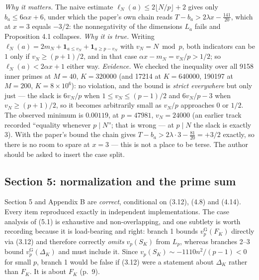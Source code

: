 \documentclass[11pt]{article}
\theoremstyle{definition}
\newcommand{\vG}{v_p^{\mathrm{G}}}
\begin{document}
\noindent\emph{Why it matters.} The naive estimate $\ell_N(a)\le2\lfloor N/p\rfloor+2$ gives only
$b_a\le6\alpha x+6$, under which the paper's own chain reads
$T-b_a>2\lambda x-\tfrac{141}{20}$, which at $x=3$ equals $-3/2$: the nonnegativity of the
dimensions $L_a$ fails and Proposition 4.1 collapses. \emph{Why it is true.} Writing
$\ell_N(a)=2m_N+\mathbf{1}_{a\le v_N}+\mathbf{1}_{a\ge p-v_N}$ with $v_N=N\bmod p$, both
indicators can be $1$ only if $v_N\ge(p+1)/2$, and in that case $\alpha x-m_N=v_N/p>1/2$; so
$\ell_N(a)<2\alpha x+1$ either way. \emph{Evidence.} We checked the inequality over all 9158
inner primes at $M=40$, $K=320000$ (and 17214 at $K=640000$, 190197 at $M=200$,
$K=8\times10^6$): no violation, and the bound is \emph{strict everywhere} but only just ---
the slack is $6v_N/p$ when $1\le v_N\le(p-1)/2$ and $6v_N/p-3$ when $v_N\ge(p+1)/2$, so it
becomes arbitrarily small as $v_N/p$ approaches $0$ or $1/2$. The observed minimum is
$0.00119$, at $p=47981$, $v_N=24000$ (an earlier track recorded ``equality whenever $p\mid N$'';
that is wrong --- at $p\mid N$ the slack is exactly $3$). With the paper's bound the chain gives
$T-b_a>2\lambda\cdot3-\tfrac{81}{20}=+3/2$ exactly, so there is no room to spare at $x=3$ ---
this is not a place to be terse. The author should be asked to insert the case split.

\subsection{Section 5: normalization and the prime sum}

Section 5 and Appendix B are \emph{correct}, conditional on (3.12), (4.8) and (4.14). Every item
reproduced exactly in independent implementations. The case analysis of (5.1) is exhaustive and
non-overlapping, and one subtlety is worth recording because it is load-bearing and right:
branch 1 bounds $\vG(F_K)$ directly via (3.12) and therefore correctly \emph{omits} $v_p(S_K)$
from $L_p$, whereas branches 2--3 bound $\vG(\Delta_K)$ and must include it. Since
$v_p(S_K)\sim-1110n^2/(p-1)<0$ for small $p$, branch 1 would be false if (3.12) were a statement
about $\Delta_K$ rather than $F_K$. It is about $F_K$ (p.~9).
\end{document}
